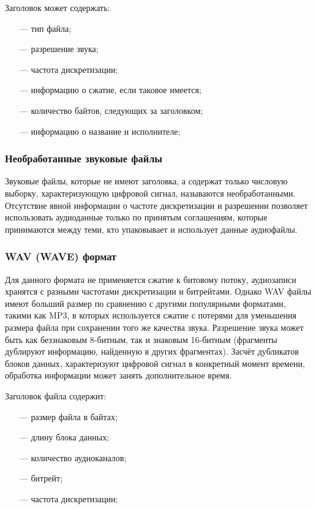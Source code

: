 	\par Заголовок может содержать:
	\begin{itemize}
		\item[---] тип файла;
		\item[---] разрешение звука;
		\item[---] частота дискретизации;
		\item[---] информацию о сжатие, если таковое имеется;
		\item[---] количество байтов, следующих за заголовком;
		\item[---] ​​информацию о название и исполнителе;
	\end{itemize} 

	\subsubsection{Необработанные звуковые файлы}
		\par Звуковые файлы, которые не имеют заголовка, а содержат только числовую выборку, характеризующую цифровой сигнал, называются необработанными.
		Отсутствие явной информации о частоте дискретизации и разрешении позволяет использовать аудиоданные только по принятым соглашениям,
		которые принимаются между теми, кто упаковывает и использует данные аудиофайлы.

	\subsubsection{WAV (WAVE) формат}
		\par Для данного формата не применяется сжатие к битовому потоку, аудиозаписи хранятся с разными частотами дискретизации и битрейтами.  
		Однако WAV файлы имеют больший размер по сравнению с другими популярными форматами, такими как MP3, в которых используется сжатие с потерями для уменьшения размера файла при сохранении того же качества звука.
		Разрешение звука может быть как беззнаковым 8-битным, так и знаковым 16-битным (фрагменты дублируют информацию, найденную в других фрагментах). 
		Засчёт дубликатов блоков данных, характеризуют цифровой сигнал в конкретный момент времени, обработка информации может занять дополнительное время.
		
		\par Заголовок файла содержит:
		\begin{itemize}
			\item[---] размер файла в байтах;
			\item[---] длину блока данных;
			\item[---] количество аудиоканалов;
			\item[---] битрейт;
			\item[---] частота дискретизации;
		\end{itemize}

